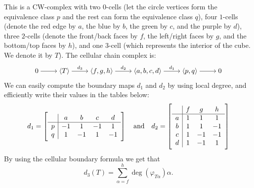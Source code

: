 \documentclass[11pt,a4paper]{article}
\begin{document}
\begin{solution}
\begin{center}
  \end{center}
  This is a CW-complex with two $0$-cells
  (let the circle vertices form the equivalence class $p$
  and the rest can form the equivalence class $q$), four $1$-cells
  (denote the red edge by $a$, the blue by $b$, the green by $c$,
  and the purple by $d$),
  three $2$-cells (denote the front/back faces by $f$,
  the left/right faces by $g$, and the bottom/top faces by $h$),
  and one $3$-cell (which represents the interior of the cube.
  We denote it by $T$).
  The cellular chain complex is:
  \[\begin{tikzcd}[ampersand replacement=\&,cramped]
    0 \& {\langle T \rangle} \& {\langle f,g,h \rangle} \& {\langle a,b,c,d \rangle} \& {\langle p,q \rangle} \& 0
    \arrow[from=1-1, to=1-2]
    \arrow["{d_3}", from=1-2, to=1-3]
    \arrow["{d_2}", from=1-3, to=1-4]
    \arrow["{d_1}", from=1-4, to=1-5]
    \arrow[from=1-5, to=1-6]
  \end{tikzcd}\]
  We can easily compute the boundary maps $d_1$ and $d_2$
  by using local degree,
  and efficiently write their values in the tables below:
  \[
    d_1 = \left[ \begin{array}{c|cccc}
    & a & b & c & d \\ \hline
    p & -1 & 1  & -1 & 1 \\
    q & 1  & -1 & 1  & -1
    \end{array} \right]
    \quad \text{and} \quad
    d_2 = \left[ \begin{array}{c|ccc}
    & f & g & h \\ \hline
    a & 1 & 1  & 1 \\
    b & 1 & 1  & -1 \\
    c & 1 & -1 & -1 \\
    d & 1 & -1 & 1
    \end{array} \right]
  \]
  By using the cellular boundary formula we get that
  \[
    d_3(T) = \sum_{\alpha = f}^{h} \deg(\varphi_{T \alpha}) \alpha. 
\]
\end{solution}
\end{document}
